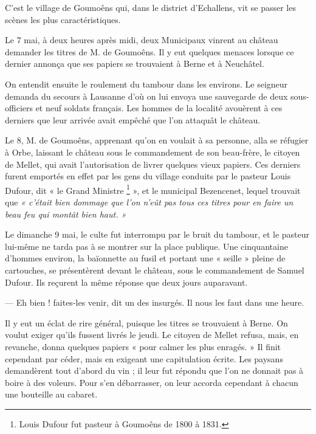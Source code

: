 \documentclass[french,twoside]{book} %
\begin{document}
\noindent C’est le village de Goumoêns qui, dans le district d’Echallens, vit se passer les scènes les plus caractéristiques.\par
Le 7 mai, à deux heures après midi, deux Municipaux vinrent au château demander les titres de M. de Goumoêns. Il y eut quelques menaces lorsque ce dernier annonça que ses papiers se trouvaient à Berne et à Neuchâtel.\par
On entendit ensuite le roulement du tambour dans les environs. Le seigneur demanda du secours à Lausanne d’où on lui envoya une sauvegarde de deux sous-officiers et neuf soldats français. Les hommes de la localité avouèrent à ces derniers que leur arrivée avait empêché que l’on attaquât le château.\par
Le 8, M. de Goumoêns, apprenant qu’on en voulait à sa personne, alla se réfugier à Orbe, laissant le château sous le commandement de son beau-frère, le citoyen de Mellet, qui avait l’autorisation de livrer quelques vieux papiers. Ces derniers furent emportés en effet par les gens du village conduits par le pasteur Louis Dufour, dit « le Grand Ministre \footnote{Louis Dufour fut pasteur à Goumoêns de 1800 à 1831.} », et le municipal Bezencenet, lequel trouvait que \emph{« c’était bien dommage que l’on n’eût pas tous ces titres pour en faire un beau feu qui montât bien haut. »}\par
Le dimanche 9 mai, le culte fut interrompu par le bruit du tambour, et le pasteur lui-même ne tarda pas à se montrer sur la place publique. Une cinquantaine d’hommes environ, la baïonnette au fusil et portant une « seille » pleine de cartouches, se présentèrent devant le château, sous le commandement de Samuel Dufour. Ils reçurent la même réponse que deux jours auparavant.\par
— Eh bien ! faites-les venir, dit un des insurgés. Il nous les faut dans une heure.\par
Il y eut un éclat de rire général, puisque les titres se trouvaient à Berne. On voulut exiger qu’ils fussent livrés le jeudi. Le citoyen de Mellet refusa, mais, en revanche, donna quelques papiers « pour calmer les plus enragés. » Il finit cependant par céder, mais en exigeant une capitulation écrite. Les paysans demandèrent tout d’abord du vin ; il leur fut répondu que l’on ne donnait pas à boire à des voleurs. Pour s’en débarrasser, on leur accorda cependant à chacun une bouteille au cabaret.\par
\end{document}
